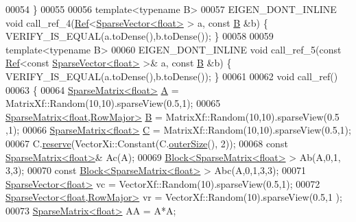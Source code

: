 \begin{DoxyCode}
00054 \}
00055 
00056 \textcolor{keyword}{template}<\textcolor{keyword}{typename} B>
00057 EIGEN\_DONT\_INLINE \textcolor{keywordtype}{void} call\_ref\_4(\hyperlink{group___core___module_class_eigen_1_1_ref}{Ref}<\hyperlink{group___sparse_core___module_class_eigen_1_1_sparse_vector}{SparseVector<float>} > a, \textcolor{keyword}{const} 
      \hyperlink{group___core___module_class_eigen_1_1_matrix}{B} &b) \{ VERIFY\_IS\_EQUAL(a.toDense(),b.toDense()); \}
00058 
00059 \textcolor{keyword}{template}<\textcolor{keyword}{typename} B>
00060 EIGEN\_DONT\_INLINE \textcolor{keywordtype}{void} call\_ref\_5(\textcolor{keyword}{const} \hyperlink{group___core___module_class_eigen_1_1_ref}{Ref}<\textcolor{keyword}{const} \hyperlink{group___sparse_core___module_class_eigen_1_1_sparse_vector}{SparseVector<float>} >& a, \textcolor{keyword}{const} 
      \hyperlink{group___core___module_class_eigen_1_1_matrix}{B} &b) \{ VERIFY\_IS\_EQUAL(a.toDense(),b.toDense()); \}
00061 
00062 \textcolor{keywordtype}{void} call\_ref()
00063 \{
00064   \hyperlink{group___sparse_core___module_class_eigen_1_1_sparse_matrix}{SparseMatrix<float>}               \hyperlink{group___core___module_class_eigen_1_1_matrix}{A} = MatrixXf::Random(10,10).sparseView(0.5,1);
00065   \hyperlink{group___sparse_core___module_class_eigen_1_1_sparse_matrix}{SparseMatrix<float,RowMajor>}      \hyperlink{group___core___module_class_eigen_1_1_matrix}{B} = MatrixXf::Random(10,10).sparseView(0.5
      ,1);
00066   \hyperlink{group___sparse_core___module_class_eigen_1_1_sparse_matrix}{SparseMatrix<float>}               \hyperlink{group___core___module}{C} = MatrixXf::Random(10,10).sparseView(0.5,1);
00067   C.\hyperlink{group___sparse_core___module_a1518e58ac49bed0e2385b722a034f7d3}{reserve}(VectorXi::Constant(C.\hyperlink{group___sparse_core___module_a4e5f706cfae14d2eaec1ea1e234905f1}{outerSize}(), 2));
00068   \textcolor{keyword}{const} \hyperlink{group___sparse_core___module_class_eigen_1_1_sparse_matrix}{SparseMatrix<float>}&        Ac(A);
00069   \hyperlink{group___core___module_class_eigen_1_1_block}{Block<SparseMatrix<float>} >       Ab(A,0,1, 3,3);
00070   \textcolor{keyword}{const} \hyperlink{group___core___module_class_eigen_1_1_block}{Block<SparseMatrix<float>} > Abc(A,0,1,3,3);
00071   \hyperlink{group___sparse_core___module_class_eigen_1_1_sparse_vector}{SparseVector<float>}               vc =  VectorXf::Random(10).sparseView(0.5,1);
00072   \hyperlink{group___sparse_core___module_class_eigen_1_1_sparse_vector}{SparseVector<float,RowMajor>}      vr =  VectorXf::Random(10).sparseView(0.5,1
      );
00073   \hyperlink{group___sparse_core___module_class_eigen_1_1_sparse_matrix}{SparseMatrix<float>} AA = A*A;

\end{DoxyCode}
